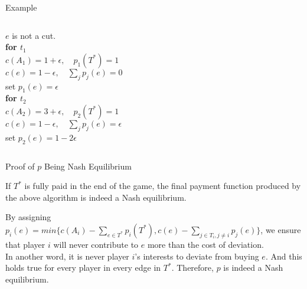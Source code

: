 \documentclass[11pt,aspectratio=169]{beamer}
\begin{document}
\begin{frame}{Example}
\begin{columns}
    \centering
\doublespacing
$e$ is not a cut.\\
\textbf{for $t_1$}\\
$c(A_1) = 1+\epsilon, \quad  p_1(T^*) = 1$\\
$c(e) = 1-\epsilon, \quad \sum_{j}p_j(e) = 0$\\
set $p_1(e) = \epsilon$\\
\textbf{for $t_2$}\\
$c(A_2) = 3+\epsilon, \quad p_2(T^*) = 1$\\
$c(e) = 1-\epsilon,\quad  \sum_{j}p_j(e) = \epsilon$\\
set $p_2(e) = 1-2\epsilon$
\end{columns}
\end{frame}

\begin{frame}{Proof of \(p\) Being Nash Equilibrium}
\begin{corollary}
	If $T^*$ is fully paid in the end of the game, the final payment function produced by the above algorithm is indeed a Nash equilibrium.
\end{corollary}
\vspace{10pt}
By assigning $p_i(e) = min\{c(A_i) - \sum_{e\in T^*}p_i(T^*), c(e) - \sum_{j\in T_i,j\neq i}p_j(e)\}$, we ensure that player \(i\) will never contribute to \(e\) more than the cost of deviation. \\
\vspace{10pt}
In another word, it is never player $i$'s interests to deviate from buying $e$. And this holds true for every player in every edge in $T^*$. Therefore, \(p\) is indeed a Nash equilibrium. 
\end{frame}
\end{document}
